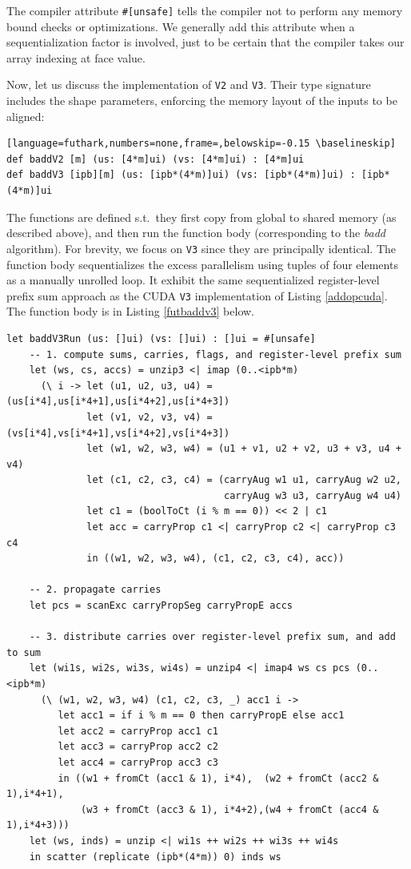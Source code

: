 The compiler attribute \texttt{\#[unsafe]} tells the compiler not to perform any
memory bound checks or optimizations. We generally add this attribute when a
sequentialization factor is involved, just to be certain that the compiler takes
our array indexing at face value.

Now, let us discuss the implementation of \texttt{V2} and \texttt{V3}. Their
type signature includes the shape parameters, enforcing the memory layout of the
inputs to be aligned:
\begin{lstlisting}[language=futhark,numbers=none,frame=,belowskip=-0.15 \baselineskip]
def baddV2 [m] (us: [4*m]ui) (vs: [4*m]ui) : [4*m]ui
def baddV3 [ipb][m] (us: [ipb*(4*m)]ui) (vs: [ipb*(4*m)]ui) : [ipb*(4*m)]ui
\end{lstlisting}
The functions are defined s.t.\ they first copy from global to shared memory (as
described above), and then run the function body (corresponding to the
\textit{badd} algorithm). For brevity, we focus on \texttt{V3} since they are
principally identical. The function body sequentializes the excess parallelism
using tuples of four elements as a manually unrolled loop. It exhibit the same
sequentialized register-level prefix sum approach as the CUDA \texttt{V3}
implementation of Listing \ref{addopcuda}. The function body is in Listing
\ref{futbaddv3} below.

\begin{lstlisting}[language=futhark,firstnumber=131,gobble=2,caption={\footnotesize Futhark \textit{badd} \texttt{V3} main function body using base \texttt{ui} and carry type \texttt{ct} from file \texttt{add.fut}.},label={futbaddv3}]
  let baddV3Run (us: []ui) (vs: []ui) : []ui = #[unsafe]
    -- 1. compute sums, carries, flags, and register-level prefix sum
    let (ws, cs, accs) = unzip3 <| imap (0..<ipb*m)
      (\ i -> let (u1, u2, u3, u4) = (us[i*4],us[i*4+1],us[i*4+2],us[i*4+3])
              let (v1, v2, v3, v4) = (vs[i*4],vs[i*4+1],vs[i*4+2],vs[i*4+3])
              let (w1, w2, w3, w4) = (u1 + v1, u2 + v2, u3 + v3, u4 + v4)
              let (c1, c2, c3, c4) = (carryAug w1 u1, carryAug w2 u2,
                                      carryAug w3 u3, carryAug w4 u4)
              let c1 = (boolToCt (i % m == 0)) << 2 | c1
              let acc = carryProp c1 <| carryProp c2 <| carryProp c3 c4
              in ((w1, w2, w3, w4), (c1, c2, c3, c4), acc))

    -- 2. propagate carries
    let pcs = scanExc carryPropSeg carryPropE accs

    -- 3. distribute carries over register-level prefix sum, and add to sum
    let (wi1s, wi2s, wi3s, wi4s) = unzip4 <| imap4 ws cs pcs (0..<ipb*m)
      (\ (w1, w2, w3, w4) (c1, c2, c3, _) acc1 i ->
         let acc1 = if i % m == 0 then carryPropE else acc1
         let acc2 = carryProp acc1 c1
         let acc3 = carryProp acc2 c2
         let acc4 = carryProp acc3 c3
         in ((w1 + fromCt (acc1 & 1), i*4),  (w2 + fromCt (acc2 & 1),i*4+1),
             (w3 + fromCt (acc3 & 1), i*4+2),(w4 + fromCt (acc4 & 1),i*4+3)))
    let (ws, inds) = unzip <| wi1s ++ wi2s ++ wi3s ++ wi4s
    in scatter (replicate (ipb*(4*m)) 0) inds ws
\end{lstlisting}


